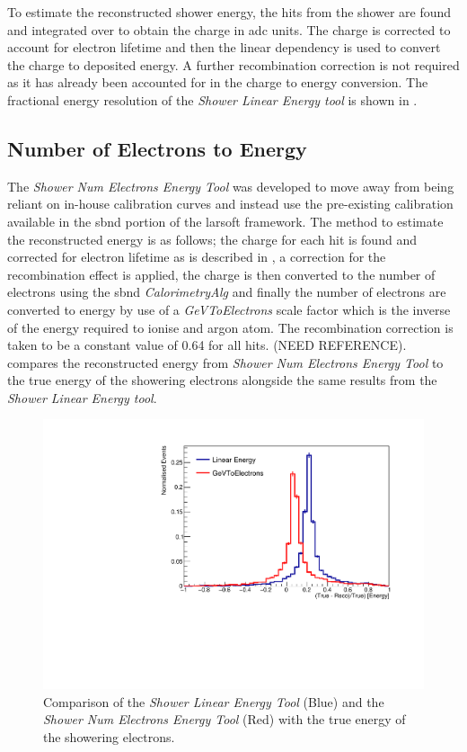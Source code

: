 To estimate the reconstructed shower energy, the hits from the shower are found and integrated over to obtain the charge in \Gls{adc} units. The charge is corrected to account for electron lifetime and then the linear dependency is used to convert the charge to deposited energy. A further recombination correction is not required as it has already been accounted for in the charge to energy conversion. The fractional energy resolution of the \textit{Shower Linear Energy tool} is shown in . 

\subsection{Number of Electrons to Energy}\label{subchap:kGeVToElectrons}
The \textit{Shower Num Electrons Energy Tool} was developed to move away from being reliant on in-house calibration curves and instead use the pre-existing calibration available in the \Gls{sbnd} portion of the \Gls{larsoft} framework. The method to estimate the reconstructed energy is as follows; the charge for each hit is found and corrected for electron lifetime as is described in , a correction for the recombination effect is applied, the charge is then converted to the number of electrons using the \Gls{sbnd} \textit{CalorimetryAlg} and finally the number of electrons are converted to energy by use of a \textit{GeVToElectrons} scale factor which is the inverse of the energy required to ionise and argon atom. The recombination correction is taken to be a constant value of 0.64 for all hits. (NEED REFERENCE).  compares the reconstructed energy from \textit{Shower Num Electrons Energy Tool} to the true energy of the showering electrons alongside the same results from the \textit{Shower Linear Energy tool}.

\newpage
\begin{figure}[h]
    \centering
    \includegraphics[width = \largefigwidth]{figures-chap4/linear_energy_kGeVElectrons_true_showering.pdf}
    \caption{Comparison of the \textit{Shower Linear Energy Tool} (Blue) and the \textit{Shower Num Electrons Energy Tool} (Red) with the true energy of the showering electrons.}
    \label{fig:linear_kGeVelectrons}
\end{figure}

